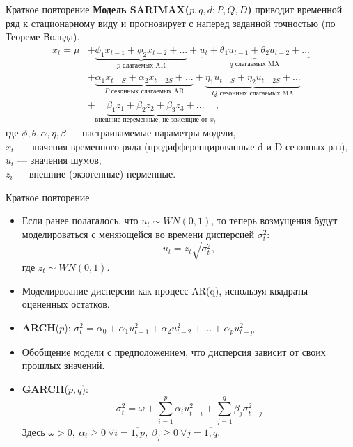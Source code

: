 
\usepackage{tikz}
\usepackage{amsmath}
\usepackage[english,russian]{babel}
\usepackage[labelformat=empty]{caption}

\usetikzlibrary{arrows,shapes,positioning,shadows,trees}
\newcommand*{\defeq}{\stackrel{\text{def}}{=}}


\begin{frame}[plain]
\titlepage
\end{frame}
\begin{frame}{Краткое повторение}
\textbf{Модель SARIMAX($p, q, d; P, Q, D$)} приводит временной ряд к стационарному виду и прогнозирует с наперед заданной точностью (по Теореме Вольда).
\begin{equation*}
    \begin{aligned}
    x_t = \mu &
    + \underbrace{\phi_1 x_{t-1} + \phi_2 x_{t-2} + ...}_{p\text{ слагаемых AR}}
    + \underbrace{u_t + \theta_1 u_{t-1} + \theta_2 u_{t-2} + ...}_{q\text{ слагаемых MA}}\\
    &+ \underbrace{\alpha_1 x_{t-S} + \alpha_2 x_{t-2S}+ ...}_{P\text{ сезонных слагаемых AR}}
    + \underbrace{\eta_1 u_{t-S} + \eta_2 u_{t-2S}+ ...}_{Q\text{ сезонных слагаемых MA}}\\
    &+ \underbrace{\beta_1 z_1 + \beta_2 z_2 + \beta_3 z_3+ ...}_{\text{внешние переменные, не звисящие от } x_t},
    \end{aligned}
\end{equation*}
где $\phi, \theta, \alpha, \eta, \beta$ --- настраивамемые параметры модели,\\
$x_t$ --- значения временного ряда (продифференцированные d и D сезонных раз),\\
$u_t$ --- значения шумов,\\
$z_i$ --- внешние (экзогенные) перменные.
\end{frame}
\begin{frame}{Краткое повторение}
\begin{itemize}
\item Если ранее полагалось, что $u_t \sim WN(0,1)$, то теперь возмущения будут моделироваться с меняющейся во времени дисперсией $\sigma_t^2$: $$u_t =  z_t \sqrt{\sigma_t^2},$$ где $z_t \sim WN(0,1)$.
\item  Моделирвоание дисперсии как процесс AR(q), используя квадраты оцененных остатков.
\item \textbf{ARCH}($p$): $ \sigma_t^2 = \alpha_0 + \alpha_1 u_{t-1}^2 + \alpha_2 u_{t-2}^2 + \dots + \alpha_p u_{t-p}^2$.
\item Обобщение модели с предположением, что дисперсия зависит от своих прошлых значений.\\
\item\textbf{GARCH}($p, q$):
$$ \sigma_t^2 = \omega + \sum_{i=1}^p \alpha_i u_{t-i}^2 + \sum_{j=1}^q \beta_j \sigma_{t-j}^2$$
Здесь $\omega > 0, \ \alpha_i \geq 0 \ \forall i = \overline{1, p}, \ \beta_j \geq 0 \ \forall j = \overline{1, q}$.
\end{itemize}
\end{frame}
